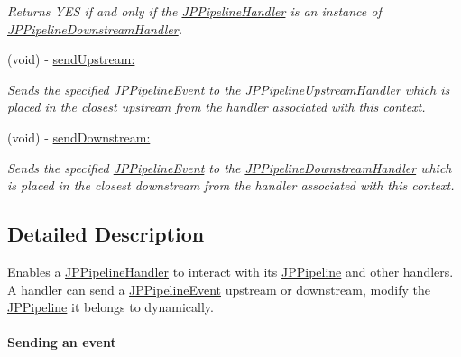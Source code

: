 \begin{DoxyCompactItemize}
\begin{DoxyCompactList}\small\item\em Returns YES if and only if the \hyperlink{a00029}{JPPipelineHandler} is an instance of \hyperlink{a00021}{JPPipelineDownstreamHandler}. \item\end{DoxyCompactList}\item 
\hypertarget{a00030_a9ab02ec0933865652634c54595ff7dd7}{
(void) -\/ \hyperlink{a00030_a9ab02ec0933865652634c54595ff7dd7}{sendUpstream:}}
\label{a00030_a9ab02ec0933865652634c54595ff7dd7}

\begin{DoxyCompactList}\small\item\em Sends the specified \hyperlink{a00023}{JPPipelineEvent} to the \hyperlink{a00035}{JPPipelineUpstreamHandler} which is placed in the closest upstream from the handler associated with this context. \item\end{DoxyCompactList}\item 
\hypertarget{a00030_a292ed51fe0b2e1ce6b2ed517be5fa5e8}{
(void) -\/ \hyperlink{a00030_a292ed51fe0b2e1ce6b2ed517be5fa5e8}{sendDownstream:}}
\label{a00030_a292ed51fe0b2e1ce6b2ed517be5fa5e8}

\begin{DoxyCompactList}\small\item\em Sends the specified \hyperlink{a00023}{JPPipelineEvent} to the \hyperlink{a00021}{JPPipelineDownstreamHandler} which is placed in the closest downstream from the handler associated with this context. \item\end{DoxyCompactList}\end{DoxyCompactItemize}


\subsection{Detailed Description}
Enables a \hyperlink{a00029}{JPPipelineHandler} to interact with its \hyperlink{a00019}{JPPipeline} and other handlers. A handler can send a \hyperlink{a00023}{JPPipelineEvent} upstream or downstream, modify the \hyperlink{a00019}{JPPipeline} it belongs to dynamically.\par


\paragraph*{Sending an event}

